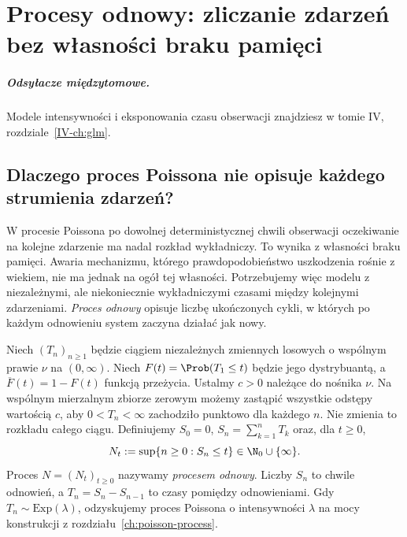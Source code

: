 \chapter{Procesy odnowy: zliczanie zdarzeń bez własności braku pamięci}
\label{ch:renewal}
\paragraph{Odsyłacze międzytomowe.} Modele intensywności i eksponowania czasu obserwacji znajdziesz w tomie IV, rozdziale~\ref{IV-ch:glm}.


\section{Dlaczego proces Poissona nie opisuje każdego strumienia zdarzeń?}
W procesie Poissona po dowolnej deterministycznej chwili obserwacji oczekiwanie na
kolejne zdarzenie ma nadal rozkład wykładniczy. To wynika z własności
braku pamięci. Awaria mechanizmu, którego prawdopodobieństwo
uszkodzenia rośnie z wiekiem, nie ma jednak na ogół tej własności.
Potrzebujemy więc modelu z niezależnymi, ale niekoniecznie
wykładniczymi czasami między kolejnymi zdarzeniami.
\emph{Proces odnowy} opisuje liczbę ukończonych cykli, w których
po każdym odnowieniu system zaczyna działać jak nowy.

\begin{definicja}
Niech $(T_n)_{n\ge1}$ będzie ciągiem niezależnych zmiennych
losowych o wspólnym prawie $\nu$ na $(0,\infty)$.
Niech $F(t)=\Prob(T_1\le t)$ będzie jego dystrybuantą,
a $\overline F(t)=1-F(t)$ funkcją przeżycia.
Ustalmy $c>0$ należące do nośnika $\nu$.
Na wspólnym mierzalnym zbiorze zerowym możemy
zastąpić wszystkie odstępy wartością $c$, aby
$0<T_n<\infty$ zachodziło punktowo dla każdego $n$.
Nie zmienia to rozkładu całego ciągu.
Definiujemy $S_0=0$,
$S_n=\sum_{k=1}^nT_k$ oraz, dla $t\ge0$,
\[
N_t:=\sup\{n\ge0:S_n\le t\}\in\N_0\cup\{\infty\}.
\]
Proces $N=(N_t)_{t\ge0}$ nazywamy \emph{procesem odnowy}.
Liczby $S_n$ to chwile odnowień, a $T_n=S_n-S_{n-1}$
to czasy pomiędzy odnowieniami. Gdy $T_n\sim\mathrm{Exp}(\lambda)$,
odzyskujemy proces Poissona o intensywności $\lambda$
na mocy konstrukcji z rozdziału~\ref{ch:poisson-process}.
\end{definicja}

